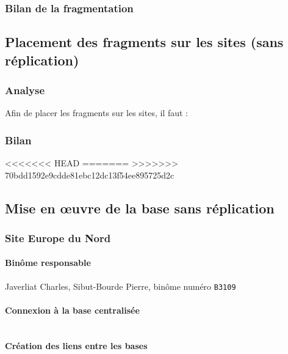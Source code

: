 \documentclass[10pt,a4paper]{article}
\theoremstyle{plain}
\begin{document}
\subsubsection{Bilan de la fragmentation}

\subsection{Placement des fragments sur les sites (sans réplication)}
\subsubsection{Analyse}
Afin de placer les fragments sur les sites, il faut :
\subsubsection{Bilan}
<<<<<<< HEAD
=======
>>>>>>> 70bdd1592e9cdde81ebc12dc13f54ee895725d2c

\newpage
\subsection{Mise en \oe uvre de la base sans réplication}
\subsubsection{Site Europe du Nord}

\paragraph{Binôme responsable}

Javerliat Charles, Sibut-Bourde Pierre, binôme numéro \verb|B3109|

\paragraph{Connexion à la base centralisée}

\inputminted{sql}{EUN_connexion_db_ryori.sql}

\paragraph{Création des liens entre les bases}
\end{document}
